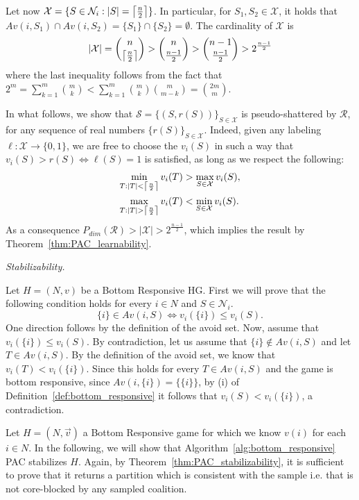 \documentclass[letterpaper]{article} %
\makeatletter
\DeclarePairedDelimiter{\ceil}{\lceil}{\rceil}
\newcommand{\set}[1]{\{#1\}}
\newcommand{\sample}{\ensuremath{\mathcal{S}}}
\newcommand{\proofpart}[1]{%
  \par
  \addvspace{\smallskipamount}%
  \noindent\emph{#1} \hspace{2pt}
}
\makeatother
\begin{document}
Let now $\mathcal{X}=\{ S \in \mathcal{N}_i : |S| = \ceil*{\frac{n}{2}} \}$. 
%
In particular, for $S_1,S_2\in\mathcal{X}$, it holds that $Av(i,S_1)\cap Av(i,S_2)= \{S_1\}\cap \{S_2\}=\emptyset$.
The cardinality of $\mathcal{X}$ is 
\[
|\mathcal{X}|=\binom{n}{\ceil*{\frac{n}{2}}} > \binom{n}{\frac{n-1}{2}} >
\binom{n-1}{\frac{n-1}{2}} > 2^{\frac{n-1}{2}} 
\]
where the last inequality follows from the fact that
$
2^m = \sum_{k=1}^m \binom{m}{k} < \sum_{k=1}^m\binom{m}{k}\binom{m}{m-k} = \binom{2m}{m}.
$

In what follows, we show that $\sample = \{(S, r(S))\}_{S \in \mathcal{X}}$ is pseudo-shattered by $\mathcal{R}$, for any sequence of real numbers $\{r(S)\}_{S \in \mathcal{X}}$.
Indeed, given any labeling $\ell:\mathcal{X} \rightarrow \{0, 1\}$, we are free to choose the $v_i(S)$ in such a way that $v_i(S) > r(S) \Leftrightarrow \ell(S) = 1$ is satisfied, as long as we respect the following:
\begin{align*}
\min_{T: |T| < \ceil*{\frac{n}{2}}}{v_i(T)} &> \max_{S \in \mathcal{X}} v_i(S),\\
\max_{T: |T| > \ceil*{\frac{n}{2}}}{v_i(T)} &< \min_{S \in \mathcal{X}} v_i(S).
\end{align*}
As a consequence $P_{dim}(\mathcal{R})>|\mathcal{X}|>2^{\frac{n-1}{2}}$, 
which implies the result by Theorem~\ref{thm:PAC_learnability}.
%
\proofpart{Stabilizability.}
Let $H=(N, v)$ be a Bottom Responsive HG. First we will prove that the following condition holds for every $i\in N$ and $S \in \mathcal{N}_i$.
\begin{equation}\label{eq:br_av_condition}
  \{ i \} \in Av(i, S) \iff  v_i(\set{i}) \leq v_i(S) .  
\end{equation}
One direction follows by the definition of the avoid set.
Now, assume that $v_i(\set{i}) \leq v_i(S)$. By contradiction, let us assume that $\set{i} \notin Av(i, S)$ and let $T \in Av(i,S)$. By the definition of the avoid set, we know that $v_i(T) < v_i(\set{i})$. Since this holds for every $T\in Av(i,S)$ and the game is bottom responsive, since $Av(i, \set{i})=\set{\set{i}}$, by (i) of Definition~\ref{def:bottom_responsive} it follows that $v_i(S) < v_i(\set{i})$, a contradiction.

Let $H=(N, \vec{v})$ a Bottom Responsive game for which we know $v(i)$ for each $i \in N$. In the following, we will show that Algorithm~\ref{alg:bottom_responsive}
PAC stabilizes $H$. Again, by Theorem~\ref{thm:PAC_stabilizability}, it is sufficient to prove that it returns a partition which is consistent with the sample i.e. that is not core-blocked by any sampled coalition.
\end{document}
